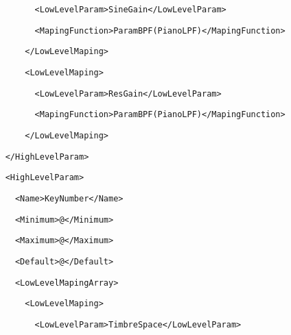 \documentclass[a4paper,english,american]{book}
\begin{document}
{\begin{spacing}{0.8}
{}
\par
\texttt{\footnotesize ~~~~~~~~~~<LowLevelParam>SineGain</LowLevelParam>}{\footnotesize\par
}
\par
\texttt{\footnotesize ~~~~~~~~~~<MapingFunction>ParamBPF(PianoLPF)</MapingFunction>}{\footnotesize\par
}
\par
\texttt{\footnotesize ~~~~~~~~</LowLevelMaping>}{\footnotesize\par
}
\par
\texttt{\footnotesize ~~~~~~~~<LowLevelMaping>}{\footnotesize\par
}
\par
\texttt{\footnotesize ~~~~~~~~~~<LowLevelParam>ResGain</LowLevelParam>}{\footnotesize\par
}
\par
\texttt{\footnotesize ~~~~~~~~~~<MapingFunction>ParamBPF(PianoLPF)</MapingFunction>}{\footnotesize\par
}
\par
\texttt{\footnotesize ~~~~~~~~</LowLevelMaping>}{\footnotesize\par
}
\par
\texttt{\footnotesize ~~~~</HighLevelParam>}{\footnotesize\par
}
\par
\texttt{\footnotesize ~~~~<HighLevelParam>}{\footnotesize\par
}
\par
\texttt{\footnotesize ~~~~~~<Name>KeyNumber</Name>}{\footnotesize\par
}
\par
\texttt{\footnotesize ~~~~~~<Minimum>@</Minimum>}{\footnotesize\par
}
\par
\texttt{\footnotesize ~~~~~~<Maximum>@</Maximum>}{\footnotesize\par
}
\par
\texttt{\footnotesize ~~~~~~<Default>@</Default>}{\footnotesize\par
}
\par
\texttt{\footnotesize ~~~~~~<LowLevelMapingArray>}{\footnotesize\par
}
\par
\texttt{\footnotesize ~~~~~~~~<LowLevelMaping>}{\footnotesize\par
}
\par
\texttt{\footnotesize ~~~~~~~~~~<LowLevelParam>TimbreSpace</LowLevelParam>}{\footnotesize\par
}
\end{spacing}}
\end{document}
